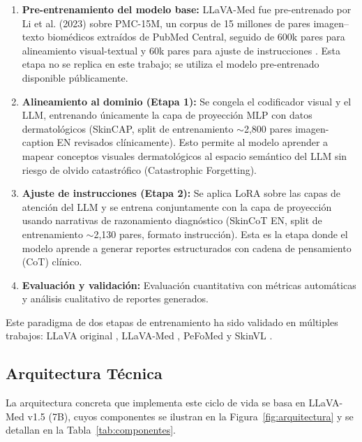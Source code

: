 \documentclass[11pt, a4paper]{article}
\begin{document}
\begin{enumerate}
    \item \textbf{Pre-entrenamiento del modelo base:} LLaVA-Med fue pre-entrenado por Li et al. (2023) sobre PMC-15M, un corpus de 15 millones de pares imagen--texto biomédicos extraídos de PubMed Central, seguido de 600k pares para alineamiento visual-textual y 60k pares para ajuste de instrucciones \cite{li_llava-med_2023}. Esta etapa no se replica en este trabajo; se utiliza el modelo pre-entrenado disponible públicamente.
    
    \item \textbf{Alineamiento al dominio (Etapa 1):} Se congela el codificador visual y el LLM, entrenando únicamente la capa de proyección MLP con datos dermatológicos (SkinCAP, split de entrenamiento $\sim$2,800 pares imagen-caption EN revisados clínicamente). Esto permite al modelo aprender a mapear conceptos visuales dermatológicos al espacio semántico del LLM sin riesgo de olvido catastrófico (Catastrophic Forgetting).

    \item \textbf{Ajuste de instrucciones (Etapa 2):} Se aplica LoRA sobre las capas de atención del LLM y se entrena conjuntamente con la capa de proyección usando narrativas de razonamiento diagnóstico (SkinCoT EN, split de entrenamiento $\sim$2,130 pares, formato instrucción). Esta es la etapa donde el modelo aprende a generar reportes estructurados con cadena de pensamiento (CoT) clínico.
    
    \item \textbf{Evaluación y validación:} Evaluación cuantitativa con métricas automáticas y análisis cualitativo de reportes generados.
\end{enumerate}

Este paradigma de dos etapas de entrenamiento ha sido validado en múltiples trabajos: LLaVA original \cite{liu_visual_2023}, LLaVA-Med \cite{li_llava-med_2023}, PeFoMed \cite{he_pefomed_2024} y SkinVL \cite{zhao_mm-skin_2025}.

\subsection{Arquitectura Técnica}

La arquitectura concreta que implementa este ciclo de vida se basa en LLaVA-Med v1.5 (7B), cuyos componentes se ilustran en la Figura~\ref{fig:arquitectura} y se detallan en la Tabla~\ref{tab:componentes}.
\end{document}
